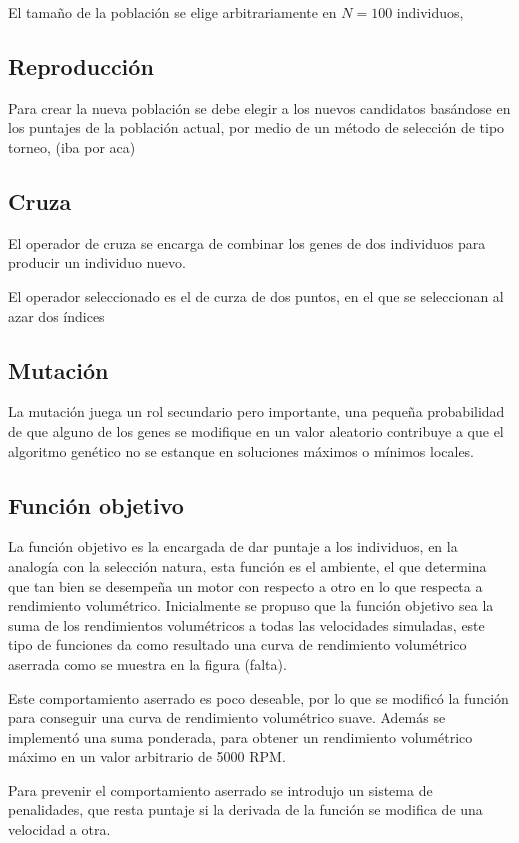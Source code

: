 El tamaño de la población se elige arbitrariamente en $N=100$ individuos, 

\subsection{Reproducción}

Para crear la nueva población se debe elegir a los nuevos candidatos basándose
en los puntajes de la población actual, por medio de un método de selección de
tipo torneo, (iba por aca)
%


\subsection{Cruza}
%
El operador de cruza se encarga de combinar los genes de dos individuos para
producir un individuo nuevo.

El operador seleccionado es el de curza de dos puntos, en el que se seleccionan
al azar dos índices


\subsection{Mutación}
%
La mutación juega un rol secundario pero importante, una pequeña probabilidad
de que alguno de los genes se modifique en un valor aleatorio contribuye a que
el algoritmo genético no se estanque en soluciones máximos o mínimos locales.

\subsection{Función objetivo}
%
La función objetivo es la encargada de dar puntaje a los individuos, en la
analogía con la selección natura, esta función es el ambiente, el que determina
que tan bien se desempeña un motor con respecto a otro en lo que respecta a
rendimiento volumétrico.
%
Inicialmente se propuso que la función objetivo sea la suma de los rendimientos
volumétricos a todas las velocidades simuladas, este tipo de funciones da como
resultado una curva de rendimiento volumétrico aserrada como se muestra en la
figura (falta).

Este comportamiento aserrado es poco deseable, por lo que se modificó la
función para conseguir una curva de rendimiento volumétrico suave.
%
Además se implementó una suma ponderada, para obtener un rendimiento
volumétrico máximo en un valor arbitrario de 5000 RPM.\@

Para prevenir el comportamiento aserrado se introdujo un sistema de
penalidades, que resta puntaje si la derivada de la función se modifica de una
velocidad a otra.


